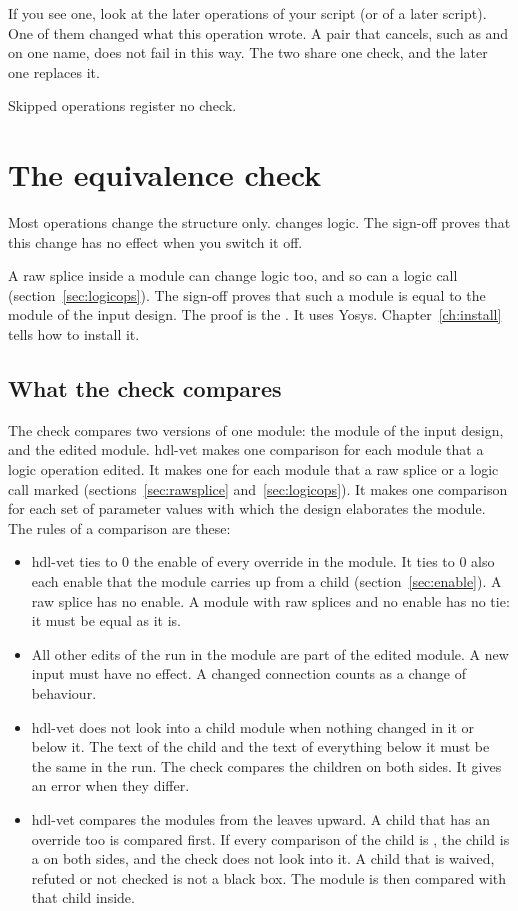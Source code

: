 If you see one, look at the later operations of your script (or of a later script).
One of them changed what this operation wrote. A pair that cancels, such as
 and  on one name, does not fail in
this way. The two share one check, and the later one replaces it.

Skipped operations register no check.

\section{The equivalence check}
\label{sec:equiv}

Most operations change the structure only.  changes logic.
The sign-off proves that this change has no effect when you switch it off.

A raw splice inside a module can change logic too, and so can a logic call
(section~\ref{sec:logicops}). The sign-off proves that such a module
is equal to the module of the input design. The proof is the . It
uses Yosys. Chapter~\ref{ch:install} tells how to install it.

\subsection*{What the check compares}

The check compares two versions of one module: the module of the input design, and the
edited module. hdl-vet makes one comparison for each module that a logic operation
edited. It makes one for each module that a raw splice or a logic call marked
(sections~\ref{sec:rawsplice} and~\ref{sec:logicops}). It makes
one comparison for each set of parameter values with which the design elaborates the
module. The rules of a comparison are these:

\begin{itemize}
\item hdl-vet ties to 0 the enable of every override in the module. It ties to 0 also each
  enable that the module carries up from a child (section~\ref{sec:enable}). A raw splice has
  no enable. A module with raw splices and no enable has no tie: it must be equal as it is.
\item All other edits of the run in the module are part of the edited module. A new input
  must have no effect. A changed connection counts as a change of behaviour.
\item hdl-vet does not look into a child module when nothing changed in it or below it.
  The text of the child and the text of everything below it must be the same in the run.
  The check compares the children on both sides. It gives an error when they differ.
\item hdl-vet compares the modules from the leaves upward. A child that has an override
  too is compared first. If every comparison of the child is , the child is a
   on both sides, and the check does not look into it. A child that is
  waived, refuted or not checked is not a black box. The module is then compared with that
  child inside.
\end{itemize}


